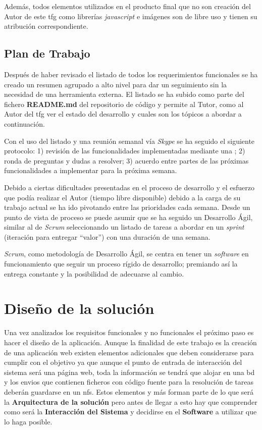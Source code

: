 \documentclass[11pt,spanish,listoffigures,listoftables]{tfgetsinf}
\begin{document}
Además, todos elementos utilizados en el producto final que no son creación del Autor de este \acrshort{tfg} como librerías \textit{javascript} e imágenes son de libre uso y tienen su atribución correspondiente.

\section{Plan de Trabajo}

Después de haber revisado el listado de todos los requerimientos funcionales se ha creado un resumen agrupado a alto nivel para dar un seguimiento sin la necesidad de una herramienta externa. El listado se ha subido como parte del fichero \textbf{README.md} del repositorio de código y permite al Tutor, como al Autor del \acrshort{tfg} ver el estado del desarrollo y cuales son los tópicos a abordar a continuación.

Con el uso del listado y una reunión semanal vía \textit{Skype} se ha seguido el siguiente protocolo: 1) revisión de las funcionalidades implementadas mediante una ; 2) ronda de preguntas y dudas a resolver; 3) acuerdo entre partes de las próximas funcionalidades a implementar para la próxima semana.

Debido a ciertas dificultades presentadas en el proceso de desarrollo y el esfuerzo que podía realizar el Autor (tiempo libre disponible) debido a la carga de su trabajo actual se ha ido pivotando entre las prioridades cada semana. Desde un punto de vista de proceso se puede asumir que se ha seguido un Desarrollo Ágil, similar al de \textit{Scrum} seleccionando un listado de tareas a abordar en un \textit{sprint} (iteración para entregar ``valor'') con una duración de una semana. 

\textit{Scrum}, como metodología de Desarrollo Ágil, se centra en tener un \textit{software} en funcionamiento que seguir un proceso rígido de desarrollo; premiando así la entrega constante y la posibilidad de adecuarse al cambio. 


\chapter{Diseño de la solución}

Una vez analizados los requisitos funcionales y no funcionales el próximo paso es hacer el diseño de la aplicación. Aunque la finalidad de este trabajo es la creación de una aplicación web existen elementos adicionales que deben considerarse para cumplir con el objetivo ya que aunque el punto de entrada de interacción del sistema será una página web, toda la información se tendrá que alojar en una \acrfull{bd} y los \gls{envio}s que contienen ficheros con código fuente para la resolución de \Gls{tarea}s deberán guardarse en un \acrfull{nfs}. Estos elementos y más forman parte de lo que será la \textbf{Arquitectura de la solución} pero antes de llegar a esto hay que comprender como será la \textbf{Interacción del Sistema} y decidirse en el \textbf{Software} a utilizar que lo haga posible. \par
\end{document}
